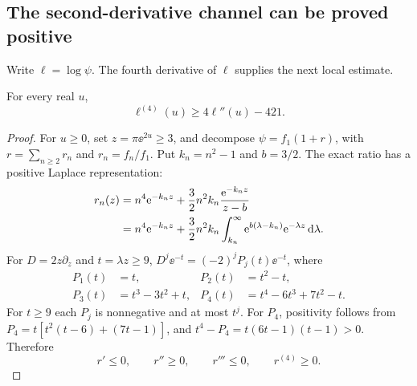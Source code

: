 \subsection{The second-derivative channel can be proved positive}
Write $\ell=\log\psi$. The fourth derivative of $\ell$ supplies the next local estimate.
\begin{lemma}\label{lem:fourthLog}
For every real $u$,
\begin{equation}\label{eq:fourthLog}
\boxed{\ell^{(4)}(u)\ge4\ell''(u)-421.}
\end{equation}
\end{lemma}
\begin{proof}
For $u\ge0$, set $z=\pi\ee^{2u}\ge3$, and decompose $\psi=f_1(1+r)$, with $r=\sum_{n\ge2}r_n$ and $r_n=f_n/f_1$. Put $k_n=n^2-1$ and $b=3/2$. The exact ratio has a positive Laplace representation:
\begin{align}\label{eq:tailLaplace}
r_n(z)
&=n^4\mathrm e^{-k_nz}+\frac32n^2k_n\frac{\mathrm e^{-k_nz}}{z-b}\notag\\
&=n^4\mathrm e^{-k_nz}
+\frac32n^2k_n\int_{k_n}^{\infty}\mathrm e^{b(\lambda-k_n)}\mathrm e^{-\lambda z}\,\mathrm d\lambda.
\end{align}
For $D=2z\partial_z$ and $t=\lambda z\ge9$,
$D^j\ee^{-t}=(-2)^jP_j(t)\ee^{-t}$, where
\begin{align*}
P_1(t)&=t,& P_2(t)&=t^2-t,\\
P_3(t)&=t^3-3t^2+t,& P_4(t)&=t^4-6t^3+7t^2-t.
\end{align*}
For $t\ge9$ each $P_j$ is nonnegative and at most $t^j$. For $P_4$, positivity follows from $P_4=t[t^2(t-6)+(7t-1)]$, and $t^4-P_4=t(6t-1)(t-1)>0$. Therefore
\begin{equation}\label{eq:tailsigns}
r'\le0,\qquad r''\ge0,\qquad r'''\le0,\qquad r^{(4)}\ge0.
\end{equation}


\end{proof}
